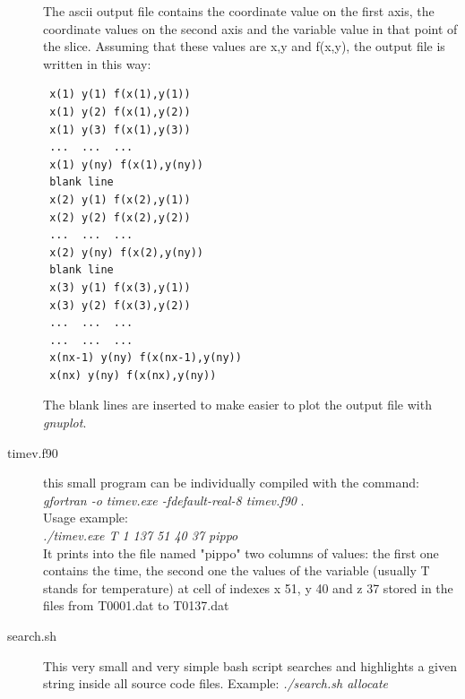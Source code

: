 \begin{description}
 The ascii output file contains the coordinate value on the first axis, the coordinate values on the second axis and the variable value in that point of the slice. Assuming that these values are x,y and f(x,y), the output file is written in this way:
 \begin{verbatim}
 x(1) y(1) f(x(1),y(1))
 x(1) y(2) f(x(1),y(2))
 x(1) y(3) f(x(1),y(3))
 ...  ...  ... 
 x(1) y(ny) f(x(1),y(ny))
 blank line
 x(2) y(1) f(x(2),y(1))
 x(2) y(2) f(x(2),y(2))
 ...  ...  ...
 x(2) y(ny) f(x(2),y(ny))
 blank line
 x(3) y(1) f(x(3),y(1))
 x(3) y(2) f(x(3),y(2))
 ...  ...  ...
 ...  ...  ...
 x(nx-1) y(ny) f(x(nx-1),y(ny))
 x(nx) y(ny) f(x(nx),y(ny))
 \end{verbatim}
The blank lines are inserted to make easier to plot the output file with \emph{gnuplot}.
\item [timev.f90] this small program can be individually compiled with the command: \emph{gfortran -o timev.exe -fdefault-real-8 timev.f90} .\\
Usage example:\\
 \textit{./timev.exe T 1 137 51 40 37 pippo}\\
 It prints into the file named "pippo" two columns of values: the first one contains the time, the second one the values of the variable (usually T stands for temperature) at cell of indexes x 51, y 40 and z 37 stored in the files from T0001.dat to T0137.dat\\ 

\item[search.sh] This very small and very simple bash script searches and highlights a given string inside all source code files. Example: \emph{./search.sh allocate}
\end{description}


